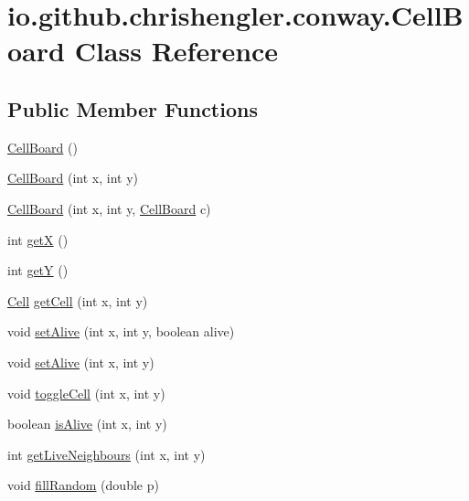 \hypertarget{classio_1_1github_1_1chrishengler_1_1conway_1_1_cell_board}{}\section{io.\+github.\+chrishengler.\+conway.\+Cell\+Board Class Reference}
\label{classio_1_1github_1_1chrishengler_1_1conway_1_1_cell_board}
\subsection*{Public Member Functions}
\begin{DoxyCompactItemize}
\item 
\hyperlink{classio_1_1github_1_1chrishengler_1_1conway_1_1_cell_board_a13f6f829a47361da0ae5feb4452e05da}{Cell\+Board} ()
\item 
\hyperlink{classio_1_1github_1_1chrishengler_1_1conway_1_1_cell_board_af5d2bb5b5bf6bce6c1f645f90035b3df}{Cell\+Board} (int x, int y)
\item 
\hyperlink{classio_1_1github_1_1chrishengler_1_1conway_1_1_cell_board_a19ec9d77e5e2f13444580cb1a1a84993}{Cell\+Board} (int x, int y, \hyperlink{classio_1_1github_1_1chrishengler_1_1conway_1_1_cell_board}{Cell\+Board} c)
\item 
int \hyperlink{classio_1_1github_1_1chrishengler_1_1conway_1_1_cell_board_ace8fc31a94238951c8260d73900f42d2}{getX} ()
\item 
int \hyperlink{classio_1_1github_1_1chrishengler_1_1conway_1_1_cell_board_a73976638b3887b343c97948c1ca6cb87}{getY} ()
\item 
\hyperlink{classio_1_1github_1_1chrishengler_1_1conway_1_1_cell}{Cell} \hyperlink{classio_1_1github_1_1chrishengler_1_1conway_1_1_cell_board_a4be4493afa4071ee65393417f113c06f}{get\+Cell} (int x, int y)
\item 
void \hyperlink{classio_1_1github_1_1chrishengler_1_1conway_1_1_cell_board_a6687034f416f1eb01dd77f53e760a4d9}{set\+Alive} (int x, int y, boolean alive)
\item 
void \hyperlink{classio_1_1github_1_1chrishengler_1_1conway_1_1_cell_board_ad833b604a18460be1c79220997394e44}{set\+Alive} (int x, int y)
\item 
void \hyperlink{classio_1_1github_1_1chrishengler_1_1conway_1_1_cell_board_ae8da33157e88e9c181f0c2d33ec39032}{toggle\+Cell} (int x, int y)
\item 
boolean \hyperlink{classio_1_1github_1_1chrishengler_1_1conway_1_1_cell_board_a986fc81baaaaa18a33f24388a2eeb498}{is\+Alive} (int x, int y)
\item 
int \hyperlink{classio_1_1github_1_1chrishengler_1_1conway_1_1_cell_board_a9435723a25f77b7f2b03b4e169a3b296}{get\+Live\+Neighbours} (int x, int y)
\item 
void \hyperlink{classio_1_1github_1_1chrishengler_1_1conway_1_1_cell_board_a9b44b3d598ccae5f91556d0509b982c8}{fill\+Random} (double p)
\end{DoxyCompactItemize}


